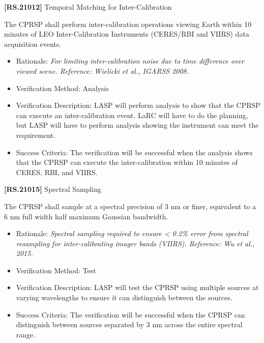 \documentclass[12pt,oneside,oldfontcommands]{memoir}
\begin{document}
\textbf{[RS.21012]} Temporal Matching for Inter-Calibration

The \gls{CPRSP} shall perform inter-calibration operations viewing Earth within 10 minutes of \gls{LEO} Inter-Calibration Instruments (CERES\slash RBI and VIIRS) data acquisition events.

\begin{itemize}
\item{} Rationale: \emph{For limiting inter-calibration noise due to time difference over viewed scene. Reference: Wielicki et al., IGARSS 2008.}

\item{} Verification Method: Analysis

\item{} Verification Description: \gls{LASP} will perform \gls{analysis} to show that the \gls{CPRSP} can execute an inter-calibration event. \gls{LaRC} will have to do the planning, but \gls{LASP} will have to perform \gls{analysis} showing the instrument can meet the requirement.

\item{} Success Criteria: The verification will be successful when the \gls{analysis} shows that the \gls{CPRSP} can execute the inter-calibration within 10 minutes of \gls{CERES}, \gls{RBI}, and \gls{VIIRS}.

\end{itemize}

\textbf{[RS.21015]} Spectral Sampling

The \gls{CPRSP} shall \gls{sample} at a spectral precision of 3 nm or finer, equivalent to a 6 nm full width half maximum Gaussian bandwidth.

\begin{itemize}
\item{} Rationale: \emph{Spectral sampling required to ensure < 0.2\% error from spectral resampling for inter-calibrating imager bands (VIIRS). Reference: Wu et al., 2015.}

\item{} Verification Method: Test

\item{} Verification Description: \gls{LASP} will \gls{test} the \gls{CPRSP} using multiple sources at varying wavelengths to ensure it can distinguish between the sources.

\item{} Success Criteria: The verification will be successful when the \gls{CPRSP} can distinguish between sources separated by 3 nm across the entire spectral range.

\end{itemize}
\end{document}
